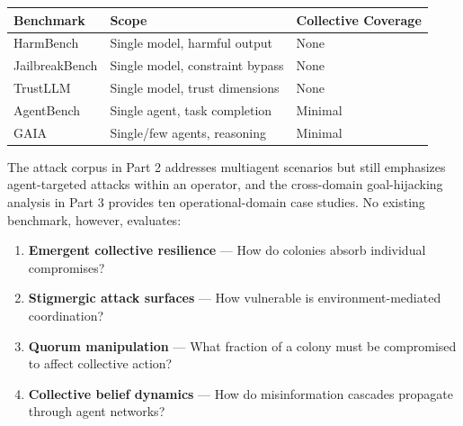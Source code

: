 \documentclass[
]{article}
\newcounter{none} %
\providecommand{\tightlist}{%
  \setlength{\itemsep}{0pt}\setlength{\parskip}{0pt}}
\begin{document}
{\def\LTcaptype{none} %
\begin{longtable}[]{@{}
  >{\raggedright\arraybackslash}p{}
  >{\raggedright\arraybackslash}p{}
  >{\raggedright\arraybackslash}p{}@{}}
\toprule\noalign{}
\begin{minipage}[b]{\linewidth}\raggedright
Benchmark
\end{minipage} & \begin{minipage}[b]{\linewidth}\raggedright
Scope
\end{minipage} & \begin{minipage}[b]{\linewidth}\raggedright
Collective Coverage
\end{minipage} \\
\midrule\noalign{}
\endhead
\bottomrule\noalign{}
\endlastfoot
HarmBench \citep{mazeika2024harmbench} & Single model, harmful output &
None \\
JailbreakBench \citep{chao2024jailbreakbench} & Single model, constraint
bypass & None \\
TrustLLM \citep{sun2024trustllm} & Single model, trust dimensions &
None \\
AgentBench \citep{liu2023agentbench} & Single agent, task completion &
Minimal \\
GAIA \citep{mialon2023gaia} & Single/few agents, reasoning & Minimal \\
\end{longtable}
}

The attack corpus in Part 2 addresses multiagent scenarios but still
emphasizes agent-targeted attacks within an operator, and the
cross-domain goal-hijacking analysis in Part 3
\cite{friedman2026cogsec3} provides ten operational-domain case studies.
No existing benchmark, however, evaluates:

\begin{enumerate}
\def\labelenumi{\arabic{enumi}.}
\tightlist
\item
  \textbf{Emergent collective resilience} --- How do colonies absorb
  individual compromises?
\item
  \textbf{Stigmergic attack surfaces} --- How vulnerable is
  environment-mediated coordination?
\item
  \textbf{Quorum manipulation} --- What fraction of a colony must be
  compromised to affect collective action?
\item
  \textbf{Collective belief dynamics} --- How do misinformation cascades
  propagate through agent networks?
\end{enumerate}
\end{document}
